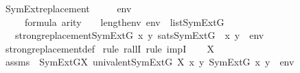 \begin{isabellebody}
{\isafoldproof}%
%
\isadelimproof
\isanewline
%
\endisadelimproof
\isanewline
{}\isamarkupfalse%
\ SymExt{\isacharunderscore}{\kern0pt}replacement\ {\isacharcolon}{\kern0pt}\isanewline
\ \ \ {\isasymphi}\ env\isanewline
\ \ \ {\isachardoublequoteopen}{\isasymphi}\ {\isasymin}\ formula{\isachardoublequoteclose}\ {\isachardoublequoteopen}arity{\isacharparenleft}{\kern0pt}{\isasymphi}{\isacharparenright}{\kern0pt}\ {\isasymle}\ {}\ {\isacharhash}{\kern0pt}{\isacharplus}{\kern0pt}\ length{\isacharparenleft}{\kern0pt}env{\isacharparenright}{\kern0pt}{\isachardoublequoteclose}\ {\isachardoublequoteopen}env\ {\isasymin}\ list{\isacharparenleft}{\kern0pt}SymExt{\isacharparenleft}{\kern0pt}G{\isacharparenright}{\kern0pt}{\isacharparenright}{\kern0pt}{\isachardoublequoteclose}\ \isanewline
\ \ \ {\isachardoublequoteopen}strong{\isacharunderscore}{\kern0pt}replacement{\isacharparenleft}{\kern0pt}{\isacharhash}{\kern0pt}{\isacharhash}{\kern0pt}SymExt{\isacharparenleft}{\kern0pt}G{\isacharparenright}{\kern0pt}{\isacharcomma}{\kern0pt}\ {\isasymlambda}x\ y{\isachardot}{\kern0pt}\ sats{\isacharparenleft}{\kern0pt}SymExt{\isacharparenleft}{\kern0pt}G{\isacharparenright}{\kern0pt}{\isacharcomma}{\kern0pt}\ {\isasymphi}{\isacharcomma}{\kern0pt}\ {\isacharbrackleft}{\kern0pt}x{\isacharcomma}{\kern0pt}\ y{\isacharbrackright}{\kern0pt}\ {\isacharat}{\kern0pt}\ env{\isacharparenright}{\kern0pt}{\isacharparenright}{\kern0pt}{\isachardoublequoteclose}\ \isanewline
%
\isadelimproof
\isanewline
\ \ %
\endisadelimproof
%
\isatagproof
{}\isamarkupfalse%
\ strong{\isacharunderscore}{\kern0pt}replacement{\isacharunderscore}{\kern0pt}def\ \isanewline
{}\isamarkupfalse%
{\isacharparenleft}{\kern0pt}rule\ rallI{\isacharcomma}{\kern0pt}\ rule\ impI{\isacharparenright}{\kern0pt}\isanewline
\isanewline
\ \ \isamarkupfalse%
\ X\isanewline
\ \ \isamarkupfalse%
\ assms{}\ {\isacharcolon}{\kern0pt}\ {\isachardoublequoteopen}{\isacharparenleft}{\kern0pt}{\isacharhash}{\kern0pt}{\isacharhash}{\kern0pt}SymExt{\isacharparenleft}{\kern0pt}G{\isacharparenright}{\kern0pt}{\isacharparenright}{\kern0pt}{\isacharparenleft}{\kern0pt}X{\isacharparenright}{\kern0pt}{\isachardoublequoteclose}\ {\isachardoublequoteopen}univalent{\isacharparenleft}{\kern0pt}{\isacharhash}{\kern0pt}{\isacharhash}{\kern0pt}SymExt{\isacharparenleft}{\kern0pt}G{\isacharparenright}{\kern0pt}{\isacharcomma}{\kern0pt}\ X{\isacharcomma}{\kern0pt}\ {\isasymlambda}x\ y{\isachardot}{\kern0pt}\ {\isacharparenleft}{\kern0pt}SymExt{\isacharparenleft}{\kern0pt}G{\isacharparenright}{\kern0pt}{\isacharcomma}{\kern0pt}\ {\isacharbrackleft}{\kern0pt}x{\isacharcomma}{\kern0pt}\ y{\isacharbrackright}{\kern0pt}\ {\isacharat}{\kern0pt}\ env\ {\isasymTurnstile}\ {\isasymphi}{\isacharparenright}{\kern0pt}{\isacharparenright}{\kern0pt}{\isachardoublequoteclose}\isanewline

\end{isabellebody}
